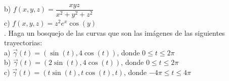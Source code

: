 \documentclass[letterpaper]{article}
\renewcommand{\*}{\cdot}
\theoremstyle{definition}
\begin{document}
\noindent b) $f(x,y,z) = \dfrac{xyz}{x^2 +y^2 +z^2}$\\

\noindent c) $f(x,y,z) = z^2e^x\cos(y)$\\



. Haga un bosquejo de las curvas que son las imágenes de las siguientes trayectorias:\\


\noindent a) $\vec{\gamma}(t) = (\sin(t), 4\cos(t))$, donde $0 \leq t \leq 2\pi$\\

\noindent b) $\vec{\gamma}(t) = (2\sin(t), 4\cos(t))$, donde $0 \leq t \leq 2\pi$\\

\noindent c) $\vec{\gamma}(t) = (t\sin(t), t\cos(t), t)$, donde $ -4\pi \leq t \leq 4\pi$\\
\end{document}
